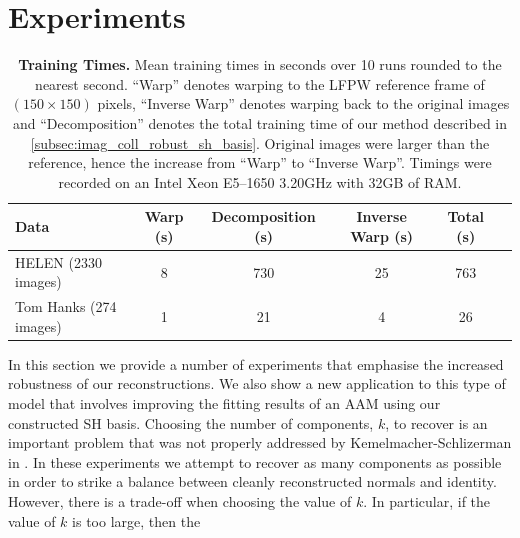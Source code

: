 \section{Experiments}\label{sec:imag_coll_experiments}
\begin{table}
    \centering
    \begin{tabular}{lccccc}
        \toprule
        \textbf{Data}          & \textbf{Warp (s)} & \textbf{Decomposition (s)} & \textbf{Inverse Warp (s)} & \textbf{Total (s)} \\ \midrule
        HELEN (2330 images)    & 8                 & 730                        & 25                        & 763                \\
        Tom Hanks (274 images) & 1                 & 21                         & 4                         & 26                 \\  \bottomrule
    \end{tabular}
    \caption{\textbf{Training Times.} Mean training times in seconds over 10
             runs rounded to the nearest second. ``Warp'' denotes warping to the
             LFPW reference frame of $(150 \times 150)$ pixels, ``Inverse Warp''
             denotes warping back to the original images and ``Decomposition''
             denotes the total training time of our method described in
             \cref{subsec:imag_coll_robust_sh_basis}. Original images were larger than 
             the reference, hence the increase from ``Warp'' to ``Inverse Warp''.
             Timings were recorded on an Intel Xeon E5--1650 3.20GHz with
             32GB of RAM.}
\label{tbl:imag_coll_timings}
\end{table}
In this section we provide a number of experiments that emphasise the increased
robustness of our reconstructions. We also show a new application to this type
of model that involves improving the fitting results of an AAM using our
constructed SH basis. Choosing the number of components, $k$, to recover is an
important problem that was not properly addressed by Kemelmacher-Schlizerman in
\cite{KemelmacherShlizerman:2013iv}. In these experiments we attempt to recover as many
components as possible in order to strike a balance between cleanly
reconstructed normals and identity. However, there is a trade-off when choosing
the value of $k$. In particular, if the value of $k$ is too large, then the
